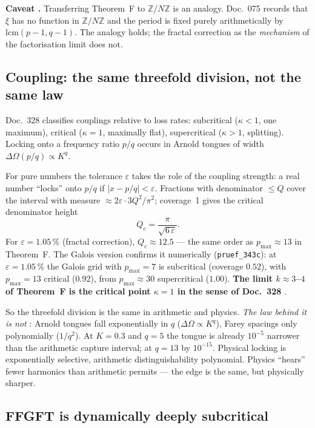 \textbf{Caveat \SM.} Transferring Theorem~F to $\mathbb{Z}/N\mathbb{Z}$ is an
analogy. Doc.~075 records that $\xi$ has no function in
$\mathbb{Z}/N\mathbb{Z}$ and the period is fixed purely arithmetically by
$\mathrm{lcm}(p-1, q-1)$. The analogy holds; the fractal correction as the
\emph{mechanism} of the factorisation limit does not.

\subsection{Coupling: the same threefold division, not the same law}

Doc.~328 classifies couplings relative to loss rates: subcritical
($\kappa < 1$, one maximum), critical ($\kappa = 1$, maximally flat),
supercritical ($\kappa > 1$, splitting). Locking onto a frequency ratio $p/q$
occurs in Arnold tongues of width $\Delta\Omega(p/q) \propto K^q$.

For pure numbers the tolerance $\varepsilon$ takes the role of the coupling
strength: a real number ``locks'' onto $p/q$ if $|x - p/q| < \varepsilon$.
Fractions with denominator $\leq Q$ cover the interval with measure
$\approx 2\varepsilon \cdot 3Q^2/\pi^2$; coverage~1 gives the critical
denominator height \BM
\begin{equation}
  Q_c = \frac{\pi}{\sqrt{6\,\varepsilon}} .
\end{equation}
For $\varepsilon = 1.05\,\%$ (fractal correction), $Q_c \approx 12.5$ --- the
same order as $p_\mathrm{max} \approx 13$ in Theorem~F. The Galois version
confirms it numerically (\texttt{pruef\_343c}): at $\varepsilon = 1.05\,\%$ the
Galois grid with $p_\mathrm{max} = 7$ is subcritical (coverage $0.52$), with
$p_\mathrm{max} = 13$ critical ($0.92$), from $p_\mathrm{max} \approx 30$
supercritical ($1.00$). \textbf{The limit $k \approx 3$--$4$ of Theorem~F is
the critical point $\kappa = 1$ in the sense of Doc.~328} \BM.

So the threefold division is the same in arithmetic and physics. \emph{The
law behind it is not} \BM: Arnold tongues fall exponentially in $q$
($\Delta\Omega \propto K^q$), Farey spacings only polynomially ($1/q^2$). At
$K = 0.3$ and $q = 5$ the tongue is already $10^{-5}$ narrower than the
arithmetic capture interval; at $q = 13$ by $10^{-15}$. Physical locking is
exponentially selective, arithmetic distinguishability polynomial. Physics
``hears'' fewer harmonics than arithmetic permits --- the edge is the same,
but physically sharper.

\subsection{FFGFT is dynamically deeply subcritical}

